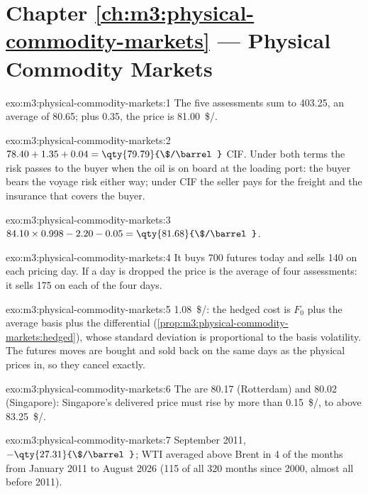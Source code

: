 \section*{Chapter \ref{ch:m3:physical-commodity-markets} --- Physical Commodity Markets}

\begin{solution}{exo:m3:physical-commodity-markets:1}
The five assessments sum to 403.25, an average of 80.65; plus 0.35, the price is
\qty{81.00}{\$/\barrel}.
\end{solution}

\begin{solution}{exo:m3:physical-commodity-markets:2}
$78.40 + 1.35 + 0.04 = \qty{79.79}{\$/\barrel}$ CIF. Under both terms the risk
passes to the buyer when the oil is on board at the loading port: the buyer bears
the voyage risk either way; under CIF the seller pays for the freight and the
insurance that covers the buyer.
\end{solution}

\begin{solution}{exo:m3:physical-commodity-markets:3}
$84.10 \times 0.998 - 2.20 - 0.05 = \qty{81.68}{\$/\barrel}$.
\end{solution}

\begin{solution}{exo:m3:physical-commodity-markets:4}
It buys 700 futures today and sells 140 on each pricing day. If a day is dropped the
price is the average of four assessments: it sells 175 on each of the four days.
\end{solution}

\begin{solution}{exo:m3:physical-commodity-markets:5}
\qty{1.08}{\$/\barrel}: the hedged cost is $F_0$ plus the average basis plus the
differential (\cref{prop:m3:physical-commodity-markets:hedged}), whose standard
deviation is proportional to the basis volatility. The futures moves are bought and
sold back on the same days as the physical prices in, so they cancel exactly.
\end{solution}

\begin{solution}{exo:m3:physical-commodity-markets:6}
The  are 80.17 (Rotterdam) and 80.02 (Singapore): Singapore's delivered
price must rise by more than \qty{0.15}{\$/\barrel}, to above
\qty{83.25}{\$/\barrel}.
\end{solution}

\begin{solution}{exo:m3:physical-commodity-markets:7}
September 2011, $-\qty{27.31}{\$/\barrel}$; WTI averaged above Brent in 4 of the
months from January 2011 to August 2026 (115 of all 320 months since 2000, almost all
before 2011).
\end{solution}


